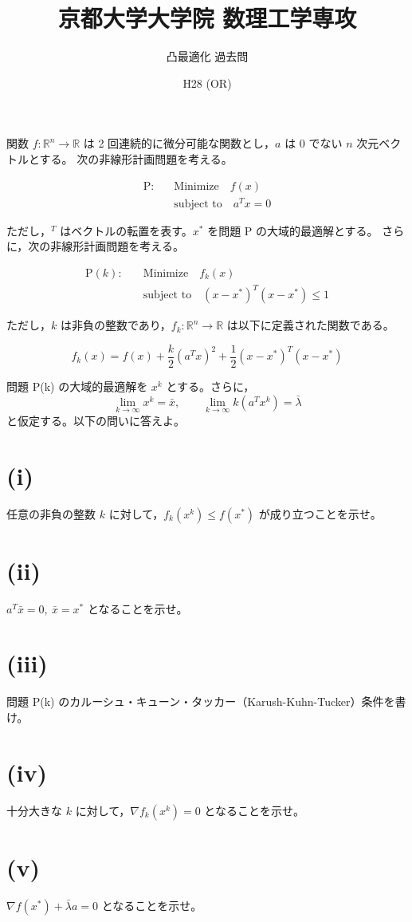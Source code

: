 \documentclass[12pt,a4paper]{article}
\title{京都大学大学院 数理工学専攻}
\author{凸最適化 過去問}
\date{H28 (OR)}
\begin{document}
\maketitle

関数 $f:\mathbb{R}^n \to \mathbb{R}$ は 2 回連続的に微分可能な関数とし，$a$ は $0$ でない $n$ 次元ベクトルとする。
次の非線形計画問題を考える。

\begin{align*}
\text{P:} \quad & \text{Minimize} \quad f(x) \\
& \text{subject to} \quad a^T x = 0
\end{align*}

ただし，$^T$ はベクトルの転置を表す。$x^*$ を問題 P の大域的最適解とする。
さらに，次の非線形計画問題を考える。

\begin{align*}
\text{P}(k): \quad & \text{Minimize} \quad f_k(x) \\
& \text{subject to} \quad (x - x^*)^T(x - x^*) \leq 1
\end{align*}

ただし，$k$ は非負の整数であり，$f_k:\mathbb{R}^n \to \mathbb{R}$ は以下に定義された関数である。

\[f_k(x) = f(x) + \frac{k}{2}(a^T x)^2 + \frac{1}{2}(x - x^*)^T(x - x^*)\]

問題 P(k) の大域的最適解を $x^k$ とする。さらに，
\[\lim_{k \to \infty} x^k = \bar{x}, \qquad \lim_{k \to \infty} k(a^T x^k) = \bar{\lambda}
\]
と仮定する。以下の問いに答えよ。

\section*{(i)}

任意の非負の整数 $k$ に対して，$f_k(x^k) \leq f(x^*)$ が成り立つことを示せ。

\section*{(ii)}

$a^T \bar{x} = 0, \ \bar{x} = x^*$ となることを示せ。

\section*{(iii)}

問題 P(k) のカルーシュ・キューン・タッカー（Karush-Kuhn-Tucker）条件を書け。

\section*{(iv)}

十分大きな $k$ に対して，$\nabla f_k(x^k) = 0$ となることを示せ。

\section*{(v)}

$\nabla f(x^*) + \bar{\lambda} a = 0$ となることを示せ。
\end{document}
